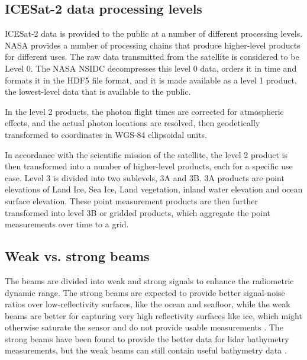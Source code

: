 
\subsection{ICESat-2 data processing levels}

ICESat-2 data is provided to the public at a number of different processing levels. NASA provides a number of processing chains that produce higher-level products for different uses. The raw data transmitted from the satellite is considered to be Level 0. The NASA NSIDC decompresses this level 0 data, orders it in time and formats it in the HDF5 file format, and it is made available as a level 1 product, the lowest-level data that is available to the public.

In the level 2 products, the photon flight times are corrected for atmospheric effects, and the actual photon locations are resolved, then geodetically transformed to coordinates in WGS-84 ellipsoidal units.

In accordance with the scientific mission of the satellite, the level 2 product is then transformed into a number of higher-level products, each for a specific use case. Level 3 is divided into two sublevels, 3A and 3B. 3A products are point elevations of Land Ice, Sea Ice, Land vegetation, inland water elevation and ocean surface elevation. These point measurement products are then further transformed into level 3B or gridded products, which aggregate the point measurements over time to a grid.


\subsection{Weak vs. strong beams}

The beams are divided into weak and strong signals to enhance the radiometric dynamic range. The strong beams are expected to provide better signal-noise ratios over low-reflectivity surfaces, like the ocean and seafloor, while the weak beams are better for capturing very high reflectivity surfaces like ice, which might otherwise saturate the sensor and do not provide usable measurements \parencite{Neumann2019d}. The strong beams have been found to provide the better data for lidar bathymetry measurements, but the weak beams can still contain useful bathymetry data \parencite{Hsu2021}.


